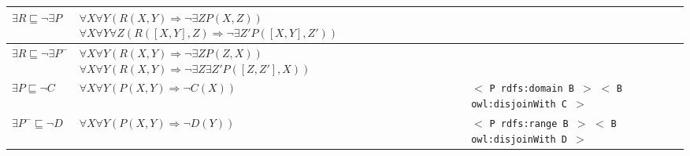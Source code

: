 \documentclass[]{article}
\begin{document}
\begin{longtable}{| p{3.7cm} | p{7cm} | p{5.2cm} |}
	\hline
		\cellcolor[gray]{0.9} $\exists R \sqsubseteq \neg \exists P$	
		&
		\cellcolor[gray]{0.9} $\forall X \forall Y (R(X,Y) \Rightarrow \neg \exists Z P(X,Z)) $ \newline
		\cellcolor[gray]{0.9} $\forall X \forall Y \forall Z (R([X,Y],Z) \Rightarrow \neg \exists Z\prime P([X,Y],Z\prime))$
		&
	\\
	
	\hline
		\cellcolor[gray]{0.9} $\exists R \sqsubseteq \neg \exists P^{-}$	
		&
		\cellcolor[gray]{0.9} $\forall X \forall Y (R(X,Y) \Rightarrow \neg \exists Z P(Z,X)) $ \newline
		\cellcolor[gray]{0.9} $\forall X \forall Y (R(X,Y) \Rightarrow \neg \exists Z \exists Z\prime P([Z,Z\prime],X)) $
		&
	\\
	
	\hline
		$\exists P \sqsubseteq \neg C$
		&
		$\forall X \forall Y (P(X,Y) \Rightarrow \neg C(X)) $
		&
		$<$ \texttt{P rdfs:domain B }$>$ \newline
		$<$ \texttt{B owl:disjoinWith C }$>$
	\\
	
	\hline
		$\exists P^{-} \sqsubseteq \neg D$
		&
		$\forall X \forall Y (P(X,Y) \Rightarrow \neg D(Y)) $
		&
		$<$ \texttt{P rdfs:range B }$>$ \newline
		$<$ \texttt{B owl:disjoinWith D }$>$
	\\
	
	\hline
	
\end{longtable}


%
%
\end{document}
